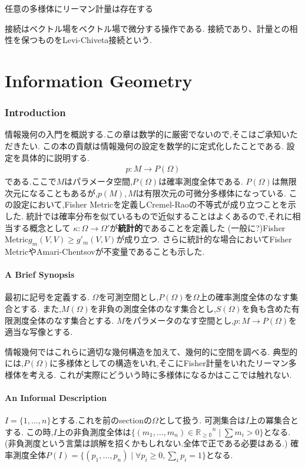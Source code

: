 \documentclass[dvipdfmx]{ujarticle}
\begin{document}
\begin{thm}
任意の多様体にリーマン計量は存在する
\end{thm}


接続はベクトル場をベクトル場で微分する操作である.
接続であり、計量との相性を保つものをLevi-Chiveta接続という.

\part{Information Geometry}
\setcounter{section}{0}
\section{Introduction}
情報幾何の入門を概説する.この章は数学的に厳密でないので,そこはご承知いただきたい.
この本の貢献は情報幾何の設定を数学的に定式化したことである.
設定を具体的に説明する.
\begin{align*}
p: M \to P(\Omega)
\end{align*}
である.ここで$M$はパラメータ空間,$P(\Omega)$は確率測度全体である.
$P(\Omega)$は無限次元になることもあるが,$p(M),M$は有限次元の可微分多様体になっている.
この設定において,Fisher Metricを定義しCremel-Raoの不等式が成り立つことを示した.
統計では確率分布を似ているもので近似することはよくあるので,それに相当する概念として
$\kappa : \Omega \to \Omega'$が\textbf{統計的}であることを定義した
(一般に?)Fisher Metric$g_m(V, V) \ge g'_m(V, V)$が成り立つ.
さらに統計的な場合においてFisher MetricやAmari-Chentsovが不変量であることも示した.



\subsection{A Brief Synopsis}
最初に記号を定義する.
$\Omega$を可測空間とし,$P(\Omega)$を$\Omega$上の確率測度全体のなす集合とする.
また,$M(\Omega)$を非負の測度全体のなす集合とし,$S(\Omega)$を負も含めた有限測度全体のなす集合とする.
$M$をパラメータのなす空間とし,$p:M \to P(\Omega)$を適当な写像とする.

情報幾何ではこれらに適切な幾何構造を加えて、幾何的に空間を調べる.
典型的には,$P(\Omega)$に多様体としての構造をいれ,そこにFisher計量をいれたリーマン多様体を考える.
これが実際にどういう時に多様体になるかはここでは触れない.


\subsection{An Informal Description}
$I=\{1, \ldots, n\}$とする.これを前のsectionの$\Omega$として扱う.
可測集合は$I$上の冪集合とする.
この時,$I$上の非負測度全体は$\{(m_1, \ldots, m_n) \in \mathbb{R_{\ge 0}}^n \mid \sum m_i > 0\}$となる.
(非負測度という言葉は誤解を招くかもしれない.全体で正である必要はある.)
確率測度全体$P(I)=\{(p_1, \ldots, p_n) \mid  \forall p_i \ge 0, \sum_i p_i = 1\}$となる.
\end{document}
